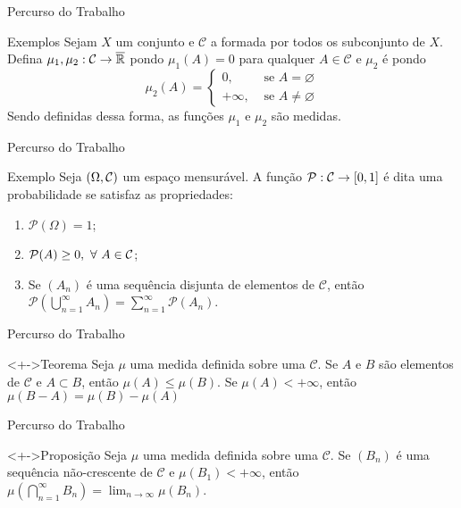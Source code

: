	\begin{frame}{Percurso do Trabalho}
		\begin{block}{Exemplos}
			Sejam $X$ um conjunto e $\mathcal{C}$ a \sigal formada por todos os subconjunto de $X$.    
			Defina $\mu_1, \mu_2:\mathcal{C} \to \operatorname{\overline{\operatorname{\mathbb{R}}}}$ pondo $\mu_1(A) = 0$ para qualquer  $A \in \mathcal{C}$ e 
			$\mu_2$ é  pondo 
			$$\mu_2(A) = \left\{\begin{array}{cc}
				0, & \textrm{\ se \ } A = \varnothing \\
				+\infty,& \textrm{\ se \ } A \neq \varnothing
			\end{array}\right.$$
			Sendo definidas dessa forma, as funções $\mu_1$ e $\mu_2$ são medidas.
		\end{block}
	\end{frame}

	\begin{frame}{Percurso do Trabalho}
		\begin{block}{Exemplo}
			\justify Seja $(\Omega, \operatorname{\mathcal{C}})$ um espaço mensurável.
			A função $\mathcal{P}:\operatorname{\mathcal{C}} \to [0,1]$ é dita uma probabilidade se satisfaz as propriedades:
			\begin{enumerate}[<+->]
				\item $\mathcal{P}(\Omega) = 1$;
				\item $\mathcal{P}(A) \geq 0,\ \forall\  A \in \operatorname{\mathcal{C}}$;
				\item Se $(A_n)$ é uma sequência disjunta de elementos de  $\mathcal{C}$, então 
				$\displaystyle\mathcal{P}\left(\bigcup_{n = 1}^\infty A_n\right) = \sum_{n = 1}^\infty\mathcal{P}(A_n)$.
			\end{enumerate}
		\end{block}
	\end{frame}
	\begin{frame}{Percurso do Trabalho}
		\begin{block}<+->{Teorema}
			\justify Seja $\mu$ uma medida definida sobre uma \sigal $\mathcal{C}$.
			Se $A$ e $B$ são elementos de $\mathcal{C}$ e $A \subset B$, então $\mu(A) \leq \mu(B)$.
			Se $\mu(A) < +\infty$, então $\mu(B-A) = \mu(B) - \mu(A)$
		\end{block}
	\end{frame}

	\begin{frame}{Percurso do Trabalho}
		\begin{block}<+->{Proposição}
			\justify Seja $\mu$ uma medida definida sobre uma \sigal $\mathcal{C}$.
			Se $(B_n)$ é uma sequência não-crescente de $\mathcal{C}$ e $\mu(B_1) < +\infty$, então 
			$\mu\left(\displaystyle \bigcap_{n = 1}^\infty B_n\right) = \displaystyle\lim_{n \to \infty} \mu(B_n)$.
		\end{block}
	\end{frame}
	
